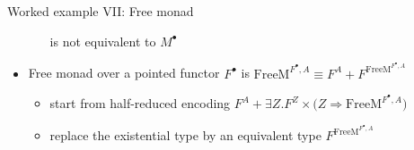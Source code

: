\documentclass[english,,russian]{beamer}
\begin{document}
\begin{frame}{Worked example VII: Free monad}
\begin{itemize}
\begin{itemize}
is not equivalent to $M^{\bullet}$
\end{itemize}
\item Free monad over a pointed functor $F^{\bullet}$ is {\footnotesize{}$\text{FreeM}^{F^{\bullet},A}\equiv F^{A}+F^{\text{FreeM}^{F^{\bullet},A}}$}{\footnotesize\par}
\begin{itemize}
\item start from half-reduced encoding $F^{A}+\exists Z.F^{Z}\times\big(Z\Rightarrow\text{FreeM}^{F^{\bullet},A}\big)$ 
\item replace the existential type by an equivalent type $F^{\text{FreeM}^{F^{\bullet},A}}$
\end{itemize}
\end{itemize}
\end{frame}
\end{document}
